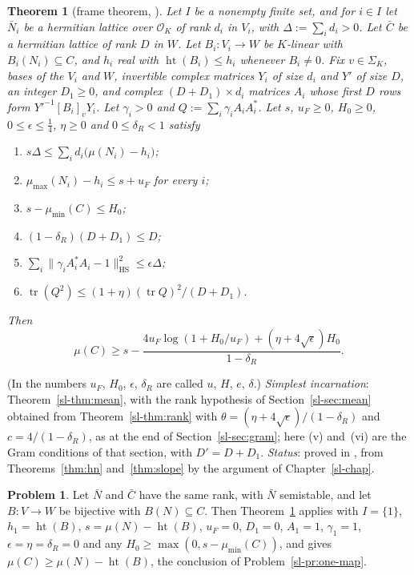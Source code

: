 \documentclass[reqno]{amsart}
\newcounter{chap}
\theoremstyle{definition}
\newtheorem{problem}{Problem}[section]
\theoremstyle{plain}
\newtheorem{theorem}{Theorem}[section]
\newcommand{\Oc}{\mathcal{O}}
\newcommand{\mumax}{\mu_{\max}}
\newcommand{\mumin}{\mu_{\min}}
\newcommand{\tr}{\operatorname{tr}}
\newcommand{\hgt}{\operatorname{ht}}
\newcommand{\HS}{\mathrm{HS}}
\begin{document}
\begin{theorem}[frame theorem, {\cite[Thm.~13.8]{Adr}}]\label{thm:frame}
Let \(I\) be a nonempty finite set, and for \(i \in I\) let \(\bar N_i\) be a hermitian lattice over \(\Oc_K\) of rank \(d_i\) in \(V_i\), with \(\Delta := \sum_i d_i > 0\).  Let \(\bar C\) be a hermitian lattice of rank \(D\) in \(W\).  Let \(B_i \colon V_i \to W\) be \(K\)-linear with \(B_i(N_i) \subseteq C\), and \(h_i\) real with \(\hgt(B_i) \le h_i\) whenever \(B_i \ne 0\).  Fix \(v \in \Sigma_K\), bases of the \(V_i\) and \(W\), invertible complex matrices \(Y_i\) of size \(d_i\) and \(Y'\) of size \(D\), an integer \(D_1 \ge 0\), and complex \((D + D_1) \times d_i\) matrices \(A_i\) whose first \(D\) rows form \(Y'^{-1}[B_i]_vY_i\).  Let \(\gamma_i > 0\) and \(Q := \sum_i \gamma_iA_iA_i^*\).  Let \(s\), \(u_F \ge 0\), \(H_0 \ge 0\), \(0 \le \epsilon \le \frac14\), \(\eta \ge 0\) and \(0 \le \delta_R < 1\) satisfy
\begin{enumerate}
\item[(i)] \(s\Delta \le \sum_i d_i\bigl(\mu(N_i) - h_i\bigr)\);
\item[(ii)] \(\mumax(N_i) - h_i \le s + u_F\) for every \(i\);
\item[(iii)] \(s - \mumin(C) \le H_0\);
\item[(iv)] \((1 - \delta_R)(D + D_1) \le D\);
\item[(v)] \(\sum_i \lVert\gamma_iA_i^*A_i - 1\rVert_\HS^2 \le \epsilon\Delta\);
\item[(vi)] \(\tr(Q^2) \le (1 + \eta)(\tr Q)^2/(D + D_1)\).
\end{enumerate}
Then
\[
  \mu(C) \ge s - \frac{4u_F\log(1 + H_0/u_F) + (\eta + 4\sqrt\epsilon)H_0}{1 - \delta_R} .
\]
\end{theorem}

(In \cite{Adr} the numbers \(u_F\), \(H_0\), \(\epsilon\), \(\delta_R\) are called \(u\), \(H\), \(e\), \(\delta\).)  \emph{Simplest incarnation}: Theorem~\ref{sl-thm:mean}, with the rank hypothesis of Section~\ref{sl-sec:mean} obtained from Theorem~\ref{sl-thm:rank} with \(\theta = (\eta + 4\sqrt\epsilon)/(1 - \delta_R)\) and \(c = 4/(1 - \delta_R)\), as at the end of Section~\ref{sl-sec:gram}; here (v) and~(vi) are the Gram conditions of that section, with \(D' = D + D_1\).  \emph{Status}: proved in \cite{Adr}, from Theorems~\ref{thm:hn} and~\ref{thm:slope} by the argument of Chapter~\ref{sl-chap}.

\begin{problem}\label{pr:one-map}
Let \(\bar N\) and \(\bar C\) have the same rank, with \(\bar N\) semistable, and let \(B \colon V \to W\) be bijective with \(B(N) \subseteq C\).  Then Theorem~\ref{thm:frame} applies with \(I = \{1\}\), \(h_1 = \hgt(B)\), \(s = \mu(N) - \hgt(B)\), \(u_F = 0\), \(D_1 = 0\), \(A_1 = 1\), \(\gamma_1 = 1\), \(\epsilon = \eta = \delta_R = 0\) and any \(H_0 \ge \max(0, s - \mumin(C))\), and gives \(\mu(C) \ge \mu(N) - \hgt(B)\), the conclusion of Problem~\ref{sl-pr:one-map}.
\end{problem}
\end{document}
